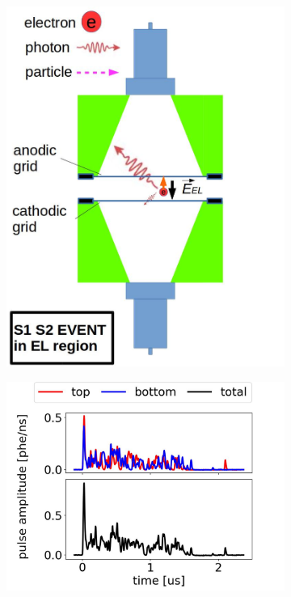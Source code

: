 \begin{figure}[!htbp]
	\centering
		\begin{subfigure}[b]{.8\textwidth}
		\centering
		\includegraphics[width=\halfwidth,clip,trim={0 0 0 0},angle=0,origin=c]{Figures/GasTest/WeiDrawEvent/S1S2ELRegion.jpg}
		\caption{}
		\label{fig:EL rad event b}
	\end{subfigure}
	\par\bigskip
		\begin{subfigure}[b]{0.7\textwidth}
		\centering
		\includegraphics[width=\figurewidth,clip,trim={0 0 0 0}]{Figures/GasTest/exampleWaveforms/proc64767id00000777.jpg}

\end{subfigure}
\end{figure}
